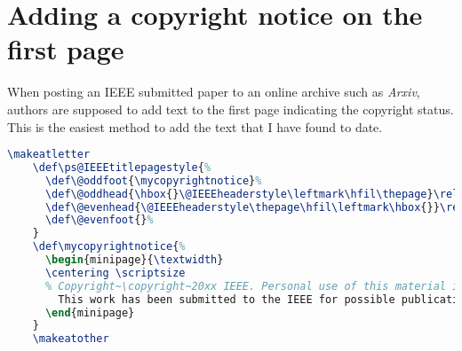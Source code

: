 \documentclass{article}
\begin{document}
\newpage

\section{Adding a copyright notice on the first page}

When posting an IEEE submitted paper to an online archive such as \emph{Arxiv}, authors are supposed to add text to the first page indicating the copyright status.  This is the easiest method to add the text that I have found to date.

\begin{lstlisting}[language=TeX]
    \makeatletter
    \def\ps@IEEEtitlepagestyle{%
      \def\@oddfoot{\mycopyrightnotice}%
      \def\@oddhead{\hbox{}\@IEEEheaderstyle\leftmark\hfil\thepage}\relax
      \def\@evenhead{\@IEEEheaderstyle\thepage\hfil\leftmark\hbox{}}\relax
      \def\@evenfoot{}%
    }
    \def\mycopyrightnotice{%
      \begin{minipage}{\textwidth}
      \centering \scriptsize
      % Copyright~\copyright~20xx IEEE. Personal use of this material is permitted. Permission from IEEE must be obtained for all other uses, in any current or future media, including\\reprinting/republishing this material for advertising or promotional purposes, creating new collective works, for resale or redistribution to servers or lists, or reuse of any copyrighted component of this work in other works by sending a request to pubs-permissions@ieee.org.
        This work has been submitted to the IEEE for possible publication. Copyright may be transferred without notice, after which this version may no longer be accessible.  
      \end{minipage}
    }
    \makeatother
\end{lstlisting}




\end{document}
